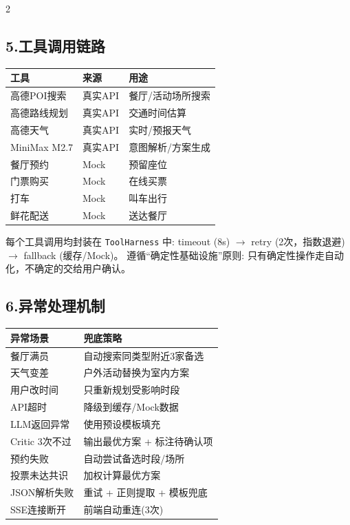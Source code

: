 \documentclass[10pt,a4paper]{ctexart}
\begin{document}
\begin{multicols}{2}

\subsection*{\color{accent}5.\;工具调用链路}

{\small
\begin{tabularx}{\columnwidth}{@{}l l X@{}}
\toprule
\textbf{工具} & \textbf{来源} & \textbf{用途} \\
\midrule
高德POI搜索  & 真实API & 餐厅/活动场所搜索 \\
高德路线规划  & 真实API & 交通时间估算 \\
高德天气      & 真实API & 实时/预报天气 \\
MiniMax M2.7  & 真实API & 意图解析/方案生成 \\
餐厅预约      & Mock   & 预留座位 \\
门票购买      & Mock   & 在线买票 \\
打车          & Mock   & 叫车出行 \\
鲜花配送      & Mock   & 送达餐厅 \\
\bottomrule
\end{tabularx}
}

\vspace{4pt}
每个工具调用均封装在 \texttt{ToolHarness} 中: timeout (8s) $\to$ retry (2次，指数退避) $\to$ fallback (缓存/Mock)。
遵循``确定性基础设施''原则: 只有确定性操作走自动化，不确定的交给用户确认。

\subsection*{\color{accent}6.\;异常处理机制}

{\scriptsize
\begin{tabularx}{\columnwidth}{@{}l X@{}}
\toprule
\textbf{异常场景} & \textbf{兜底策略} \\
\midrule
餐厅满员       & 自动搜索同类型附近3家备选 \\
天气变差       & 户外活动替换为室内方案 \\
用户改时间     & 只重新规划受影响时段 \\
API超时        & 降级到缓存/Mock数据 \\
LLM返回异常    & 使用预设模板填充 \\
Critic 3次不过 & 输出最优方案 + 标注待确认项 \\
预约失败       & 自动尝试备选时段/场所 \\
投票未达共识   & 加权计算最优方案 \\
JSON解析失败   & 重试 + 正则提取 + 模板兜底 \\
SSE连接断开    & 前端自动重连(3次) \\
\bottomrule
\end{tabularx}
}


\end{multicols}
\end{document}
